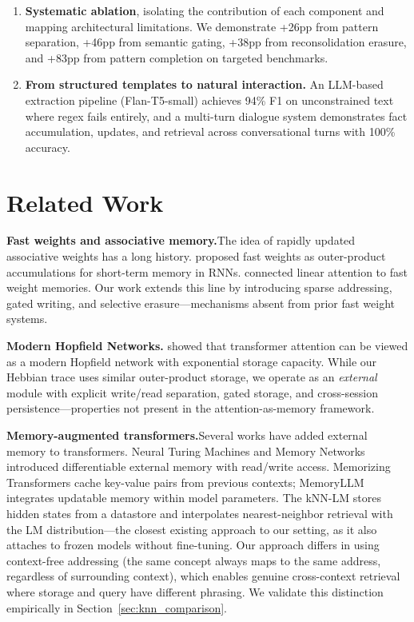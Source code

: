 \documentclass[11pt,a4paper]{article}
\begin{document}
\begin{enumerate}[leftmargin=*]
  \item \textbf{Systematic ablation}, isolating the contribution of each component and mapping architectural limitations. We demonstrate +26pp from pattern separation, +46pp from semantic gating, +38pp from reconsolidation erasure, and +83pp from pattern completion on targeted benchmarks.

  \item \textbf{From structured templates to natural interaction.} An LLM-based extraction pipeline (Flan-T5-small) achieves 94\% F1 on unconstrained text where regex fails entirely, and a multi-turn dialogue system demonstrates fact accumulation, updates, and retrieval across conversational turns with 100\% accuracy.
\end{enumerate}

\section{Related Work}

\textbf{Fast weights and associative memory.}\quad The idea of rapidly updated associative weights has a long history. \citet{ba2016using} proposed fast weights as outer-product accumulations for short-term memory in RNNs. \citet{schlag2021linear} connected linear attention to fast weight memories. Our work extends this line by introducing sparse addressing, gated writing, and selective erasure---mechanisms absent from prior fast weight systems.

\textbf{Modern Hopfield Networks.}\quad \citet{ramsauer2020hopfield} showed that transformer attention can be viewed as a modern Hopfield network with exponential storage capacity. While our Hebbian trace uses similar outer-product storage, we operate as an \emph{external} module with explicit write/read separation, gated storage, and cross-session persistence---properties not present in the attention-as-memory framework.

\textbf{Memory-augmented transformers.}\quad Several works have added external memory to transformers. Neural Turing Machines \citep{graves2014neural} and Memory Networks \citep{sukhbaatar2015end,weston2015memory} introduced differentiable external memory with read/write access. Memorizing Transformers \citep{wu2022memorizing} cache key-value pairs from previous contexts; MemoryLLM \citep{wang2024memoryllm} integrates updatable memory within model parameters. The kNN-LM \citep{khandelwal2020generalization} stores hidden states from a datastore and interpolates nearest-neighbor retrieval with the LM distribution---the closest existing approach to our setting, as it also attaches to frozen models without fine-tuning. Our approach differs in using context-free addressing (the same concept always maps to the same address, regardless of surrounding context), which enables genuine cross-context retrieval where storage and query have different phrasing. We validate this distinction empirically in Section~\ref{sec:knn_comparison}.
\end{document}
